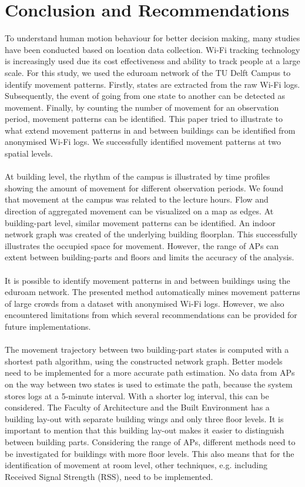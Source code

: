 \section{Conclusion and Recommendations}\label{4-conclusions}
To understand human motion behaviour for better decision making, many studies have been conducted based on location data collection. Wi-Fi tracking technology is increasingly used due its cost effectiveness and ability to track people at a large scale. For this study, we used the eduroam network of the TU Delft Campus to identify movement patterns. Firstly, states are extracted from the raw Wi-Fi logs.  Subsequently, the event of going from one state to another can be detected as movement. Finally, by counting the number of movement for an observation period, movement patterns can be identified. This paper tried to illustrate to what extend movement patterns in and between buildings can be identified from anonymised Wi-Fi logs. We successfully identified movement patterns at two spatial levels. 
\\\\
At building level, the rhythm of the campus is illustrated by time profiles showing the amount of movement for different observation periods. We found that movement at the campus was related to the lecture hours. Flow and direction of aggregated movement can be visualized on a map as edges. At building-part level, similar movement patterns can be identified. An indoor network graph was created of the underlying building floorplan. This successfully illustrates the occupied space for movement. However, the range of APs can extent between building-parts and floors and limits the accuracy of the analysis. 
\\\\
It is possible to identify movement patterns in and between buildings using the eduroam network. The presented method automatically mines movement patterns of large crowds from a dataset with anonymised Wi-Fi logs. However, we also encountered limitations from which several recommendations can be provided for future implementations.
\\\\
The movement trajectory between two building-part states is computed with a shortest path algorithm, using the constructed network graph. Better models need to be implemented for a more accurate path estimation. No data from APs on the way between two states is used to estimate the path, because the system stores logs at a 5-minute interval. With a shorter log interval, this can be considered. The Faculty of Architecture and the Built Environment has a building lay-out with separate building wings and only three floor levels. It is important to mention that this building lay-out makes it easier to distinguish between building parts. Considering the range of APs, different methods need to be investigated for buildings with more floor levels. This also means that for the identification of movement at room level, other techniques, e.g. including Received Signal Strength (RSS), need to be implemented. 
